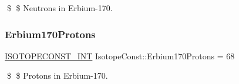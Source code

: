 \$ \$ Neutrons in Erbium-\/170. \mbox{\label{group___isotope_const-_erbium-_er170_ga54dd97d0042da25db74f39cc7d37262c}} 
\subsubsection{\texorpdfstring{Erbium170\+Protons}{Erbium170Protons}}
{\footnotesize\ttfamily \mbox{\hyperlink{group___isotope_const-_macros_ga5f18360b3e99483a35c32d789e62621c}{I\+S\+O\+T\+O\+P\+E\+C\+O\+N\+S\+T\+\_\+\+I\+NT}} Isotope\+Const\+::\+Erbium170\+Protons = 68}

\$ \$ Protons in Erbium-\/170. 